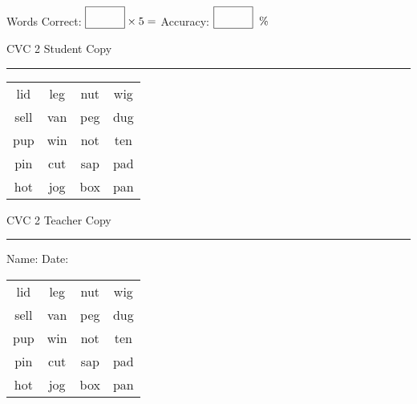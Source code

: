 \documentclass{memoir}
\begin{document}
\normalsize

Words Correct: $\fbox{\phantom{\huge 100}} \times 5 = $ Accuracy: $\fbox{\phantom{\huge 100}}\;\; \%$ 

\vfill

\newpage


\footnotesize \noindent
CVC 2 \hfill Student Copy
\smallskip
\hrule

\huge

\setlength{\tabcolsep}{14pt}
\def\arraystretch{2}

{\selectfont


\begin{vplace}[0.5]
\begin{center}
\begin{tabular}{cccc}
lid & leg & nut & wig \\
sell & van & peg & dug \\
pup & win & not & ten \\
pin & cut & sap & pad \\
hot & jog & box & pan \\
\end{tabular}
\end{center}
\end{vplace}

}

\newpage

\footnotesize \noindent
CVC 2 \hfill Teacher Copy
\smallskip
\hrule

\normalsize

\vfill

\noindent
Name: \underline{\hspace{1.75in}} \hfill Date: \underline{\hspace{1in}}

\huge

{\selectfont


\begin{vplace}[0.5]
\begin{center}
\begin{tabular}{cccc}
lid & leg & nut & wig \\
sell & van & peg & dug \\
pup & win & not & ten \\
pin & cut & sap & pad \\
hot & jog & box & pan \\
\end{tabular}
\end{center}
\end{vplace}



}
\end{document}
